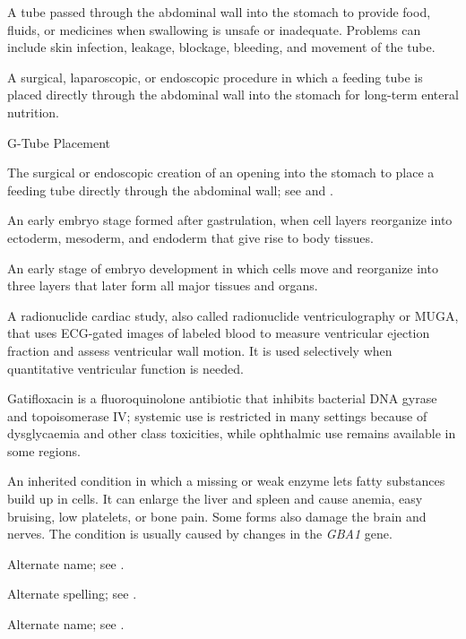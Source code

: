  A tube passed through the abdominal wall into the stomach to provide food, fluids, or medicines when swallowing is unsafe or inadequate. Problems can include skin infection, leakage, blockage, bleeding, and movement of the tube.

 A surgical, laparoscopic, or endoscopic procedure in which a feeding tube is placed directly through the abdominal wall into the stomach for long-term enteral nutrition.

\synonyms
G-Tube Placement

 The surgical or endoscopic creation of an opening into the stomach to place a feeding tube directly through the abdominal wall; see  and .

 An early embryo stage formed after gastrulation, when cell layers reorganize into ectoderm, mesoderm, and endoderm that give rise to body tissues.

 An early stage of embryo development in which cells move and reorganize into three layers that later form all major tissues and organs.

 A radionuclide cardiac study, also called radionuclide ventriculography or MUGA, that uses ECG-gated images of labeled blood to measure ventricular ejection fraction and assess ventricular wall motion. It is used selectively when quantitative ventricular function is needed.

 Gatifloxacin is a fluoroquinolone antibiotic that inhibits bacterial DNA gyrase and topoisomerase IV; systemic use is restricted in many settings because of dysglycaemia and other class toxicities, while ophthalmic use remains available in some regions.

 An inherited condition in which a missing or weak enzyme lets fatty substances build up in cells. It can enlarge the liver and spleen and cause anemia, easy bruising, low platelets, or bone pain. Some forms also damage the brain and nerves. The condition is usually caused by changes in the \textit{GBA1} gene.

 Alternate name; see .

 Alternate spelling; see .

 Alternate name; see .

